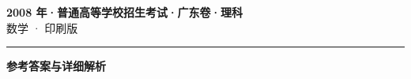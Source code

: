 \documentclass[zihao=5, a4paper]{ctexart}
\begin{document}
\begin{center}
  {\Large\bfseries 2008 年·普通高等学校招生考试·广东卷·理科}\\[4pt]
  {\large 数学 · 印刷版}
\end{center}
\medskip
{}

\par\bigskip\hrule\bigskip
{}
\begin{center}{\large\bfseries 参考答案与详细解析}\end{center}
\smallskip

\end{document}
